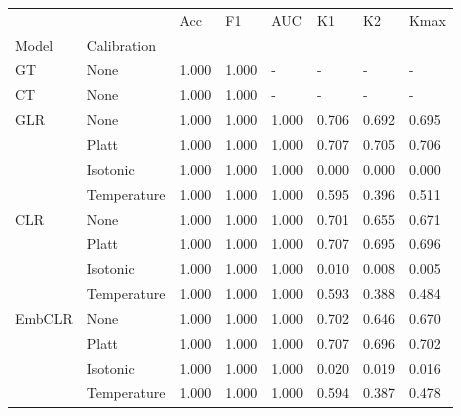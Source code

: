 \begin{tabular}{llllllll}
\toprule
 &  & Acc & F1 & AUC & K1 & K2 & Kmax \\
Model & Calibration &  &  &  &  &  &  \\
\midrule
GT & None & 1.000 & 1.000 & - & - & - & - \\
\cline{1-8}
CT & None & 1.000 & 1.000 & - & - & - & - \\
\cline{1-8}
\multirow[t]{4}{*}{GLR} & None & 1.000 & 1.000 & 1.000 & 0.706 & 0.692 & 0.695 \\
 & Platt & 1.000 & 1.000 & 1.000 & 0.707 & 0.705 & 0.706 \\
 & Isotonic & 1.000 & 1.000 & 1.000 & 0.000 & 0.000 & 0.000 \\
 & Temperature & 1.000 & 1.000 & 1.000 & 0.595 & 0.396 & 0.511 \\
\cline{1-8}
\multirow[t]{4}{*}{CLR} & None & 1.000 & 1.000 & 1.000 & 0.701 & 0.655 & 0.671 \\
 & Platt & 1.000 & 1.000 & 1.000 & 0.707 & 0.695 & 0.696 \\
 & Isotonic & 1.000 & 1.000 & 1.000 & 0.010 & 0.008 & 0.005 \\
 & Temperature & 1.000 & 1.000 & 1.000 & 0.593 & 0.388 & 0.484 \\
\cline{1-8}
\multirow[t]{4}{*}{EmbCLR} & None & 1.000 & 1.000 & 1.000 & 0.702 & 0.646 & 0.670 \\
 & Platt & 1.000 & 1.000 & 1.000 & 0.707 & 0.696 & 0.702 \\
 & Isotonic & 1.000 & 1.000 & 1.000 & 0.020 & 0.019 & 0.016 \\
 & Temperature & 1.000 & 1.000 & 1.000 & 0.594 & 0.387 & 0.478 \\
\cline{1-8}
\bottomrule
\end{tabular}
